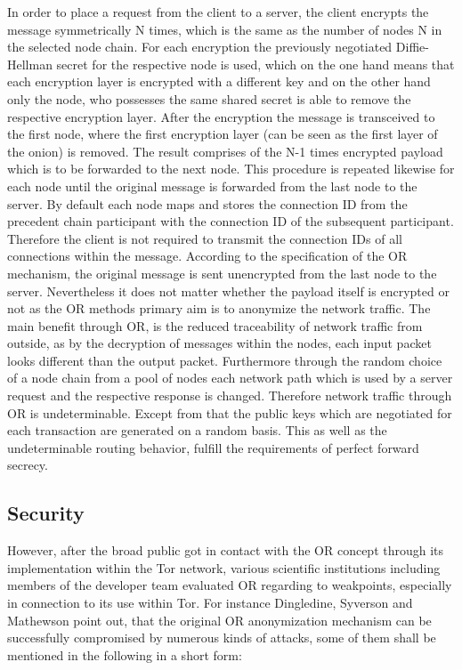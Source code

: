 \documentclass{sig-alternate}
\begin{document}
In order to place a request from the client to a server, the client encrypts the message symmetrically N times, which is the same as the number of nodes N in the selected node chain. For each encryption the previously negotiated Diffie-Hellman secret for the respective node is used, which on the one hand means that each encryption layer is encrypted with a different key and on the other hand only the node, who possesses the same shared secret is able to remove the respective encryption layer. 
After the encryption the message is transceived to the first node, where the first encryption layer (can be seen as the first layer of the onion) is removed. The result comprises of the N-1 times encrypted payload which is to be forwarded to the next node. This procedure is repeated likewise for each node until the original message is forwarded from the last node to the server. By default each node maps and stores the connection ID from the precedent chain participant with the connection ID of the subsequent participant. Therefore the client is not required to transmit the connection IDs of all connections within the message. According to the specification of the OR mechanism, the original message is sent unencrypted from the last node to the server. Nevertheless it does not matter whether the payload itself is encrypted or not as the OR methods primary aim is to anonymize the network traffic.  
The main benefit through OR, is the reduced traceability of network traffic from outside, as by the decryption of messages within the nodes, each input packet looks different than the output packet. Furthermore through the random choice of a node chain from a pool of nodes each network path which is used by a server request and the respective response is changed. Therefore network traffic through OR is undeterminable. Except from that the public keys which are negotiated for each transaction are generated on a random basis. This as well as the undeterminable routing behavior, fulfill the requirements of perfect forward secrecy\cite{diffie1992authentication}.  

\subsection{Security}

However, after the broad public got in contact with the OR concept through its implementation within the Tor network, various scientific institutions including members of the developer team evaluated OR regarding to weakpoints, especially in connection to its use within Tor. For instance Dingledine, Syverson and Mathewson\cite{dingledine2004tor} point out, that the original OR anonymization mechanism can be successfully compromised by numerous kinds of attacks, some of them shall be mentioned in the following in a short form:
\end{document}
